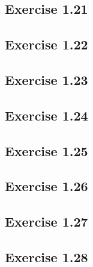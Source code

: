 \documentclass[../A&M.tex]{subfiles}
\begin{document}
\subsection*{Exercise 1.21}

\begin{comment}
(i) $\qfk\in\phi^{*^{-1}}(X_f) \iff \phi^*(\qfk) = \phi^{-1}(\qfk) \in X_f \iff f\notin \phi^{-1}(\qfk) \iff \phi(f)\notin\qfk \iff \qfk\in Y_{\phi(f)}$.

(ii) Note that $\qfk\in\phi^{*^{-1}}(V(\afk)) \iff \phi^*(\qfk) = \phi^{-1}(\qfk) =\qfk^c \in V(\afk) \iff \afk\sbe q^c$. So it's remaining to show that $\afk\sbe \qfk^c$ if and only if $\afk^e \sbe \qfk$. By (1.17) (i), if $\afk\sbe\qfk^c$, then $\afk^e\sbe\qfk^{ce} \sbe \qfk$. And conversely, if $\afk^e \sbe \qfk$, then $\afk \sbe \afk^{ec} \sbe \qfk^c$.

(iii) First, we claim that $\phi^*(V(\bfk)) \sbe V(\bfk^c)$. (Then $\ovl{\phi^*(V(\bfk))}  \sbe V(\bfk^c)$.) If $\pfk \in \phi^*(V(\bfk))$, then there exists $\qfk\spe\bfk$ s.t. $\phi^*(\qfk)=\pfk$. So $\bfk^c \sbe \qfk^c = \phi^{-1}(\qfk) = \phi^*(\qfk)=\pfk$ and hence $\pfk\in V(\bfk^c)$.

Conversely, let $V(\afk)$ be any closed set s.t. $\phi^*(V(\bfk)) \sbe V(\afk)$. We claim that $V(\bfk^c) \sbe V(\afk)$. (Then $\ovl{\phi^*(V(\bfk))}  \spe V(\bfk^c)$.) Given $\pfk \in V(\bfk^c)$. By Exercise 1.15 (i) and (1.18), we have $V(\bfk^c) = V(r(\bfk^c)) = V(r(\bfk)^c)$. So $\pfk\in V(r(\bfk)^c)$. By (1.14) and (1.13) (i),
$$
\pfk \spe r(\bfk)^c = \left( \bigcap_{\qfk \in V(\bfk)} \qfk \right)^c = \bigcap_{\qfk \in V(\bfk)} \qfk^c = \bigcap_{\qfk \in V(\bfk)} \phi^*(\qfk) = \bigcap_{\pfk \in \phi^*(V(\bfk))} \pfk \spe \bigcap_{\pfk \in V(\afk)} \pfk = r(\afk) \spe \afk 
$$
Thus, $\pfk\in V(\afk)$.
\end{comment}

\subsection*{Exercise 1.22}

\subsection*{Exercise 1.23}

\subsection*{Exercise 1.24}

\subsection*{Exercise 1.25}

\subsection*{Exercise 1.26}

\subsection*{Exercise 1.27}

\subsection*{Exercise 1.28}
\phantom{}
\end{document}
